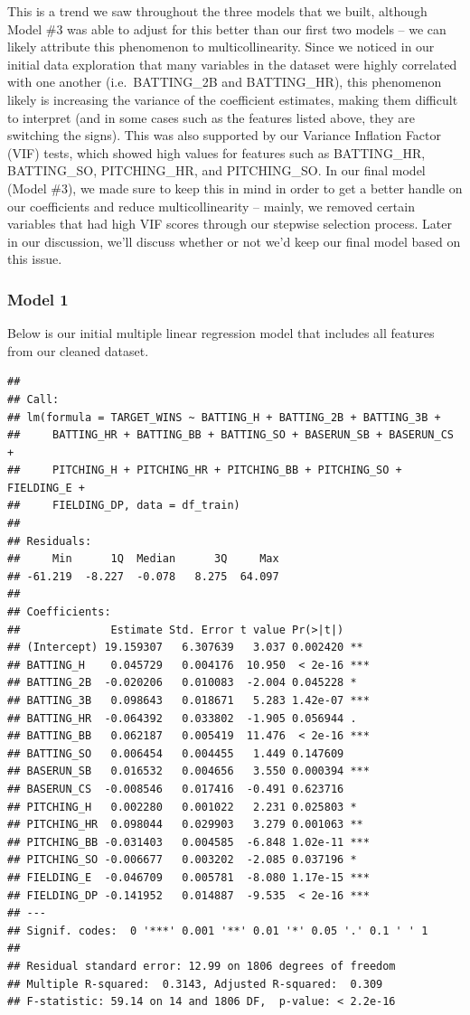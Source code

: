 \documentclass[
]{article}
\begin{document}
This is a trend we saw throughout the three models that we built,
although Model \#3 was able to adjust for this better than our first two
models -- we can likely attribute this phenomenon to multicollinearity.
Since we noticed in our initial data exploration that many variables in
the dataset were highly correlated with one another (i.e.~BATTING\_2B
and BATTING\_HR), this phenomenon likely is increasing the variance of
the coefficient estimates, making them difficult to interpret (and in
some cases such as the features listed above, they are switching the
signs). This was also supported by our Variance Inflation Factor (VIF)
tests, which showed high values for features such as BATTING\_HR,
BATTING\_SO, PITCHING\_HR, and PITCHING\_SO. In our final model (Model
\#3), we made sure to keep this in mind in order to get a better handle
on our coefficients and reduce multicollinearity -- mainly, we removed
certain variables that had high VIF scores through our stepwise
selection process. Later in our discussion, we'll discuss whether or not
we'd keep our final model based on this issue.

\hypertarget{model-1}{%
\subsubsection{Model 1}\label{model-1}}

Below is our initial multiple linear regression model that includes all
features from our cleaned dataset.

\begin{verbatim}
## 
## Call:
## lm(formula = TARGET_WINS ~ BATTING_H + BATTING_2B + BATTING_3B + 
##     BATTING_HR + BATTING_BB + BATTING_SO + BASERUN_SB + BASERUN_CS + 
##     PITCHING_H + PITCHING_HR + PITCHING_BB + PITCHING_SO + FIELDING_E + 
##     FIELDING_DP, data = df_train)
## 
## Residuals:
##     Min      1Q  Median      3Q     Max 
## -61.219  -8.227  -0.078   8.275  64.097 
## 
## Coefficients:
##              Estimate Std. Error t value Pr(>|t|)    
## (Intercept) 19.159307   6.307639   3.037 0.002420 ** 
## BATTING_H    0.045729   0.004176  10.950  < 2e-16 ***
## BATTING_2B  -0.020206   0.010083  -2.004 0.045228 *  
## BATTING_3B   0.098643   0.018671   5.283 1.42e-07 ***
## BATTING_HR  -0.064392   0.033802  -1.905 0.056944 .  
## BATTING_BB   0.062187   0.005419  11.476  < 2e-16 ***
## BATTING_SO   0.006454   0.004455   1.449 0.147609    
## BASERUN_SB   0.016532   0.004656   3.550 0.000394 ***
## BASERUN_CS  -0.008546   0.017416  -0.491 0.623716    
## PITCHING_H   0.002280   0.001022   2.231 0.025803 *  
## PITCHING_HR  0.098044   0.029903   3.279 0.001063 ** 
## PITCHING_BB -0.031403   0.004585  -6.848 1.02e-11 ***
## PITCHING_SO -0.006677   0.003202  -2.085 0.037196 *  
## FIELDING_E  -0.046709   0.005781  -8.080 1.17e-15 ***
## FIELDING_DP -0.141952   0.014887  -9.535  < 2e-16 ***
## ---
## Signif. codes:  0 '***' 0.001 '**' 0.01 '*' 0.05 '.' 0.1 ' ' 1
## 
## Residual standard error: 12.99 on 1806 degrees of freedom
## Multiple R-squared:  0.3143, Adjusted R-squared:  0.309 
## F-statistic: 59.14 on 14 and 1806 DF,  p-value: < 2.2e-16
\end{verbatim}
\end{document}
